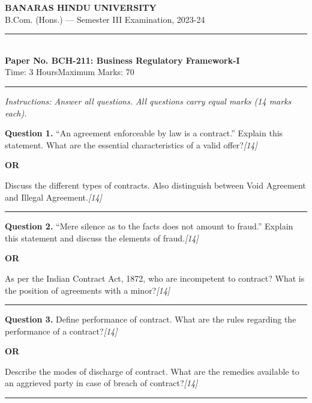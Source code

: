 \documentclass[11pt,a4paper]{article}
\newcommand{\pts}[1]{\hfill   \textit{[#1]}}
\begin{document}
\begin{center}
  {\large\bfseries BANARAS HINDU UNIVERSITY}\\[2pt]
  {\normalsize B.Com. (Hons.) --- Semester III Examination, 2023-24}\\[6pt]
  \rule{0.8\linewidth}{0.5pt}\\[6pt]
  {\large\bfseries Paper No. BCH-211: Business Regulatory Framework-I}\\[4pt]
  {\normalsize Time: 3 Hours\hfill Maximum Marks: 70}
\end{center}

\rule{\linewidth}{0.4pt}

\smallskip



\noindent   \textit{Instructions: Answer all questions. All questions carry equal marks (14 marks each).}

\bigskip




\noindent   \textbf{Question 1.}
``An agreement enforceable by law is a contract.'' Explain this statement. What are the essential characteristics of a valid offer?\pts{14}

\centerline{   \textbf{OR}}

Discuss the different types of contracts. Also distinguish between Void Agreement and Illegal Agreement.\pts{14}

\medskip\rule{\linewidth}{0.2pt}




\noindent   \textbf{Question 2.}
``Mere silence as to the facts does not amount to fraud.'' Explain this statement and discuss the elements of fraud.\pts{14}

\centerline{   \textbf{OR}}

As per the Indian Contract Act, 1872, who are incompetent to contract? What is the position of agreements with a minor?\pts{14}

\medskip\rule{\linewidth}{0.2pt}




\noindent   \textbf{Question 3.}
Define performance of contract. What are the rules regarding the performance of a contract?\pts{14}

\centerline{   \textbf{OR}}

Describe the modes of discharge of contract. What are the remedies available to an aggrieved party in case of breach of contract?\pts{14}

\medskip\rule{\linewidth}{0.2pt}
\end{document}
